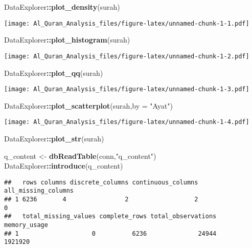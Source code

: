 \documentclass[]{article}
\newenvironment{Shaded}{\begin{snugshade}}{\end{snugshade}}
\newcommand{\DataTypeTok}[1]{\textcolor[rgb]{0.13,0.29,0.53}{#1}}
\newcommand{\KeywordTok}[1]{\textcolor[rgb]{0.13,0.29,0.53}{\textbf{#1}}}
\newcommand{\NormalTok}[1]{#1}
\newcommand{\OperatorTok}[1]{\textcolor[rgb]{0.81,0.36,0.00}{\textbf{#1}}}
\newcommand{\StringTok}[1]{\textcolor[rgb]{0.31,0.60,0.02}{#1}}
\begin{document}
\begin{Shaded}
\begin{Highlighting}[]
\NormalTok{DataExplorer}\OperatorTok{::}\KeywordTok{plot_density}\NormalTok{(surah)}
\end{Highlighting}
\end{Shaded}

\texttt{[image: Al\_Quran\_Analysis\_files/figure-latex/unnamed-chunk-1-1.pdf]}

\begin{Shaded}
\begin{Highlighting}[]
\NormalTok{DataExplorer}\OperatorTok{::}\KeywordTok{plot_histogram}\NormalTok{(surah)}
\end{Highlighting}
\end{Shaded}

\texttt{[image: Al\_Quran\_Analysis\_files/figure-latex/unnamed-chunk-1-2.pdf]}

\begin{Shaded}
\begin{Highlighting}[]
\NormalTok{DataExplorer}\OperatorTok{::}\KeywordTok{plot_qq}\NormalTok{(surah)}
\end{Highlighting}
\end{Shaded}

\texttt{[image: Al\_Quran\_Analysis\_files/figure-latex/unnamed-chunk-1-3.pdf]}

\begin{Shaded}
\begin{Highlighting}[]
\NormalTok{DataExplorer}\OperatorTok{::}\KeywordTok{plot_scatterplot}\NormalTok{(surah,}\DataTypeTok{by =} \StringTok{"Ayat"}\NormalTok{)}
\end{Highlighting}
\end{Shaded}

\texttt{[image: Al\_Quran\_Analysis\_files/figure-latex/unnamed-chunk-1-4.pdf]}

\begin{Shaded}
\begin{Highlighting}[]
\NormalTok{DataExplorer}\OperatorTok{::}\KeywordTok{plot_str}\NormalTok{(surah)}

\NormalTok{q_content <-}\StringTok{ }\KeywordTok{dbReadTable}\NormalTok{(conn,}\StringTok{"q_content"}\NormalTok{)}
\NormalTok{DataExplorer}\OperatorTok{::}\KeywordTok{introduce}\NormalTok{(q_content)}
\end{Highlighting}
\end{Shaded}

\begin{verbatim}
##   rows columns discrete_columns continuous_columns all_missing_columns
## 1 6236       4                2                  2                   0
##   total_missing_values complete_rows total_observations memory_usage
## 1                    0          6236              24944      1921920
\end{verbatim}
\end{document}
